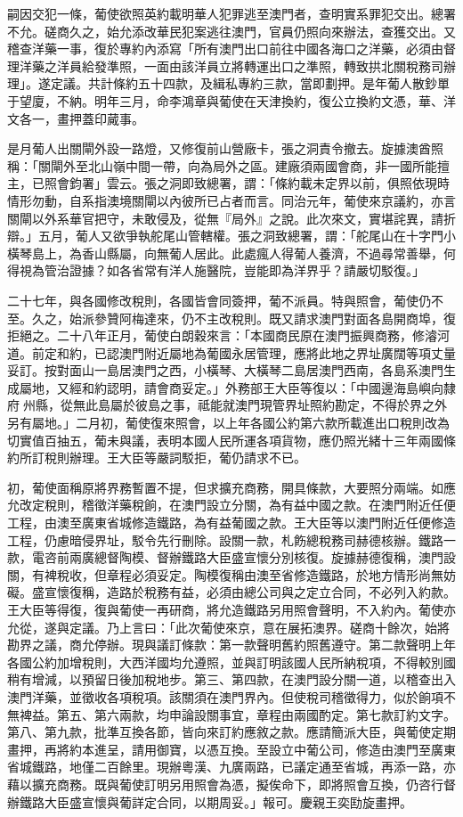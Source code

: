 \begin{pinyinscope}
嗣因交犯一條，葡使欲照英約載明華人犯罪逃至澳門者，查明實系罪犯交出。總署不允。磋商久之，始允添改華民犯案逃往澳門，官員仍照向來辦法，查獲交出。又稽查洋藥一事，復於專約內添寫「所有澳門出口前往中國各海口之洋藥，必須由督理洋藥之洋員給發準照，一面由該洋員立將轉運出口之準照，轉致拱北關稅務司辦理」。遂定議。共計條約五十四款，及緝私專約三款，當即劃押。是年葡人散鈔單于望廈，不納。明年三月，命李鴻章與葡使在天津換約，復公立換約文憑，華、洋文各一，畫押蓋印蕆事。

是月葡人出關閘外設一路燈，又修復前山營廠卡，張之洞責令撤去。旋據澳酋照稱：「關閘外至北山嶺中間一帶，向為局外之區。建廠須兩國會商，非一國所能擅主，已照會鈞署」雲云。張之洞即致總署，謂：「條約載未定界以前，俱照依現時情形勿動，自系指澳境關閘以內彼所已占者而言。同治元年，葡使來京議約，亦言關閘以外系華官把守，未敢侵及，從無『局外』之說。此次來文，實堪詫異，請折辯。」五月，葡人又欲爭執舵尾山管轄權。張之洞致總署，謂：「舵尾山在十字門小橫琴島上，為香山縣屬，向無葡人居此。此處瘋人得葡人養濟，不過尋常善舉，何得視為管治證據？如各省常有洋人施醫院，豈能即為洋界乎？請嚴切駁復。」

二十七年，與各國修改稅則，各國皆會同簽押，葡不派員。特與照會，葡使仍不至。久之，始派參贊阿梅達來，仍不主改稅則。既又請求澳門對面各島開商埠，復拒絕之。二十八年正月，葡使白朗穀來言：「本國商民原在澳門振興商務，修濬河道。前定和約，已認澳門附近屬地為葡國永居管理，應將此地之界址廣闊等項丈量妥訂。按對面山一島居澳門之西，小橫琴、大橫琴二島居澳門西南，各島系澳門生成屬地，又經和約認明，請會商妥定。」外務部王大臣等復以：「中國邊海島嶼向隸府州縣，從無此島屬於彼島之事，祗能就澳門現管界址照約勘定，不得於界之外另有屬地。」二月初，葡使復來照會，以上年各國公約第六款所載進出口稅則改為切實值百抽五，葡未與議，表明本國人民所運各項貨物，應仍照光緒十三年兩國條約所訂稅則辦理。王大臣等嚴詞駁拒，葡仍請求不已。

初，葡使面稱原將界務暫置不提，但求擴充商務，開具條款，大要照分兩端。如應允改定稅則，稽徵洋藥稅餉，在澳門設立分關，為有益中國之款。在澳門附近任便工程，由澳至廣東省城修造鐵路，為有益葡國之款。王大臣等以澳門附近任便修造工程，仍慮暗侵界址，駁令先行刪除。設關一款，札飭總稅務司赫德核辦。鐵路一款，電咨前兩廣總督陶模、督辦鐵路大臣盛宣懷分別核復。旋據赫德復稱，澳門設關，有裨稅收，但章程必須妥定。陶模復稱由澳至省修造鐵路，於地方情形尚無妨礙。盛宣懷復稱，造路於稅務有益，必須由總公司與之定立合同，不必列入約款。王大臣等得復，復與葡使一再研商，將允造鐵路另用照會聲明，不入約內。葡使亦允從，遂與定議。乃上言曰：「此次葡使來京，意在展拓澳界。磋商十餘次，始將勘界之議，商允停辦。現與議訂條款：第一款聲明舊約照舊遵守。第二款聲明上年各國公約加增稅則，大西洋國均允遵照，並與訂明該國人民所納稅項，不得較別國稍有增減，以預留日後加稅地步。第三、第四款，在澳門設分關一道，以稽查出入澳門洋藥，並徵收各項稅項。該關須在澳門界內。但使稅司稽徵得力，似於餉項不無裨益。第五、第六兩款，均申論設關事宜，章程由兩國酌定。第七款訂約文字。第八、第九款，批準互換各節，皆向來訂約應敘之款。應請簡派大臣，與葡使定期畫押，再將約本進呈，請用御寶，以憑互換。至設立中葡公司，修造由澳門至廣東省城鐵路，地僅二百餘里。現辦粵漢、九廣兩路，已議定通至省城，再添一路，亦藉以擴充商務。既與葡使訂明另用照會為憑，擬俟命下，即將照會互換，仍咨行督辦鐵路大臣盛宣懷與葡詳定合同，以期周妥。」報可。慶親王奕劻旋畫押。


\end{pinyinscope}
